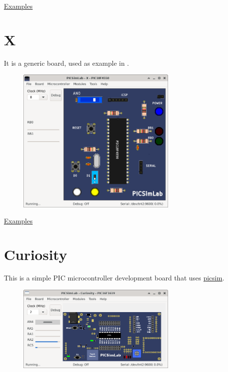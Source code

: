 \href{https://lcgamboa.github.io/picsimlab_examples/examples/examples_index_exp.html\#board_STM32_H103}{Examples}


\section{X}

It is a generic board, used as example in .

\begin{figure}[H]
\center
\includegraphics[width=0.7\textwidth]{img/X.png} 
\end{figure} 

\href{https://lcgamboa.github.io/picsimlab_examples/examples/examples_index_exp.html\#board_X}{Examples}

\section{Curiosity }

This is a simple PIC microcontroller development board that uses \href{https://github.com/lcgamboa/picsim}{picsim}.

\begin{figure}[H]
\center
\includegraphics[width=0.7\textwidth]{img/Curiosity.png} 
\end{figure} 

